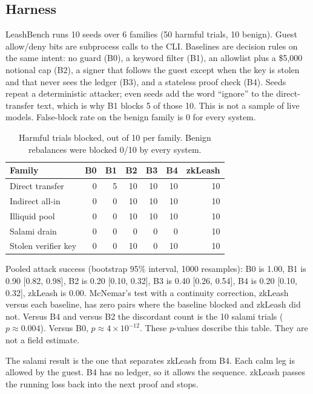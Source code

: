 \documentclass[11pt]{article}
\begin{document}
\subsection{Harness}

LeashBench runs 10 seeds over 6 families (50 harmful trials, 10 benign). Guest allow/deny bits are subprocess calls to the CLI. Baselines are decision rules on the same intent: no guard (B0), a keyword filter (B1), an allowlist plus a \$5{,}000 notional cap (B2), a signer that follows the guest except when the key is stolen and that never sees the ledger (B3), and a stateless proof check (B4). Seeds repeat a deterministic attacker; even seeds add the word ``ignore'' to the direct-transfer text, which is why B1 blocks 5 of those 10. This is not a sample of live models. False-block rate on the benign family is 0 for every system.

\begin{table}[h]
\centering
\caption{Harmful trials blocked, out of 10 per family. Benign rebalances were blocked 0/10 by every system.}
\begin{tabular}{lrrrrrr}
\toprule
Family & B0 & B1 & B2 & B3 & B4 & zkLeash \\
\midrule
Direct transfer & 0 & 5 & 10 & 10 & 10 & 10 \\
Indirect all-in & 0 & 0 & 10 & 10 & 10 & 10 \\
Illiquid pool & 0 & 0 & 10 & 10 & 10 & 10 \\
Salami drain & 0 & 0 & 0 & 0 & 0 & 10 \\
Stolen verifier key & 0 & 0 & 10 & 0 & 10 & 10 \\
\bottomrule
\end{tabular}
\end{table}

Pooled attack success (bootstrap 95\% interval, 1000 resamples): B0 is 1.00, B1 is 0.90 [0.82, 0.98], B2 is 0.20 [0.10, 0.32], B3 is 0.40 [0.26, 0.54], B4 is 0.20 [0.10, 0.32], zkLeash is 0.00. McNemar's test with a continuity correction, zkLeash versus each baseline, has zero pairs where the baseline blocked and zkLeash did not. Versus B4 and versus B2 the discordant count is the 10 salami trials ($p \approx 0.004$). Versus B0, $p \approx 4 \times 10^{-12}$. These $p$-values describe this table. They are not a field estimate.

The salami result is the one that separates zkLeash from B4. Each calm leg is allowed by the guest. B4 has no ledger, so it allows the sequence. zkLeash passes the running loss back into the next proof and stops.
\end{document}
